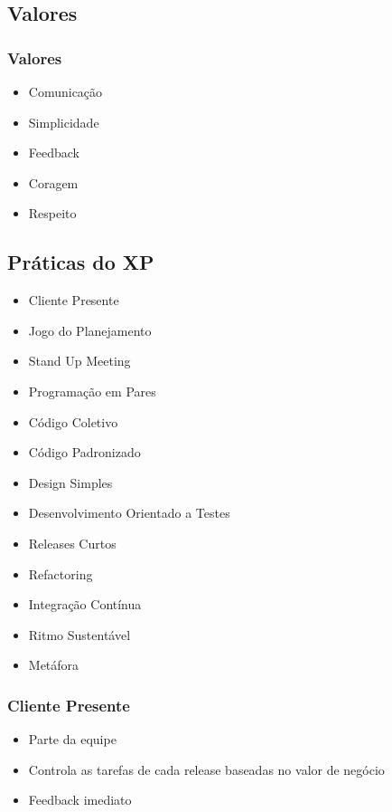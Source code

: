 \documentclass[10pt]{beamer}
\begin{document}
\subsection{Valores}
\begin{frame}
  \frametitle{Valores}
  \begin{itemize}
  \item Comunicação
  \item Simplicidade
  \item Feedback
  \item Coragem
  \item Respeito
  \end{itemize}
\end{frame}

\subsection{Práticas do XP}
\begin{frame}
  \begin{itemize}
  \item Cliente Presente
  \item Jogo do Planejamento
  \item Stand Up Meeting
  \item Programação em Pares
  \item Código Coletivo
  \item Código Padronizado
  \item Design Simples
  \item Desenvolvimento Orientado a Testes
  \item Releases Curtos
  \item Refactoring
  \item Integração Contínua
  \item Ritmo Sustentável
  \item Metáfora
  \end{itemize}
\end{frame}

\begin{frame}
  \frametitle{Cliente Presente}
  \begin{itemize}
  \item Parte da equipe
  \item Controla as tarefas de cada release baseadas no valor de negócio
  \item Feedback imediato
  \end{itemize}
\end{frame}
\end{document}
